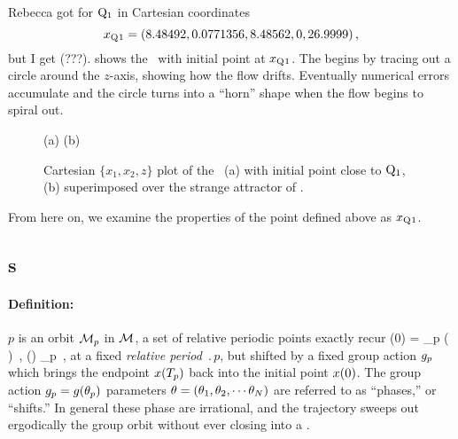 {%

Rebecca got for
$\mathrm{Q}_{1}$ in Cartesian coordinates
\[x_{\mathrm{Q}_{}1} = (8.48492,0.0771356,8.48562,0,26.9999)
\,,
\]
but I get (???).
 shows the \cLf\ with initial point at
$x_{\mathrm{Q}_{}1}$. The {\reqv} begins by tracing out a circle
around the $z$-axis, showing how the flow drifts. Eventually
numerical errors accumulate and the circle turns into a
``horn'' shape when the flow begins to spiral out.
\begin{figure}[h]
\begin{center}
(a) %
(b) %
\end{center}
\caption{
Cartesian $\{x_1,x_2,z\}$ plot of the \cLf\ (a) with initial point
close to $\mathrm{Q}_{1}$, (b) superimposed over the strange attractor of
.
    }
\label{fig:CLERelEqui}
\end{figure}

From
here on, we examine the properties of the point defined
above as $x_{\mathrm{Q}_{}1}$.

\subsection{\Rpo s}
\label{SF:rpos}

\paragraph{Definition:
           \Rpo}
$p$ is an orbit ${\cal M}_p$ in {\statesp} ${\cal M}$, a set of relative periodic
points exactly recur
\beq
\ssp (0) = \LieEl_p \ssp ( )
    \,,\qquad
\ssp (\tau) \in \pS_p
    \,,
\label{RPOrelper1}
\eeq
at a fixed {\em relative period} $\period{p}$, but
shifted by a fixed group action ${g_p}$
which brings the endpoint $x ({T_{p}} ) $
back into the initial point $x (0) $.
The group action ${g_p}=g({\bf \theta}_p)$ parameters  %
${\bf \theta} = ({\bf \theta}_1,{\bf \theta}_2,\cdots{\bf \theta}_N)$
are referred to as ``phases,'' or ``shifts.''
%
In general these phase are irrational, and the trajectory  %
sweeps out ergodically the group orbit without ever closing
into a \po.

}
